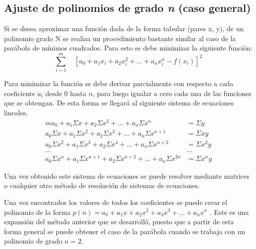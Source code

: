 \documentclass[11pt,letterpaper]{article}
\begin{document}
\subsection{Ajuste de polinomios de grado \textit{n}	 (caso general)}
Si se desea aproximar una función dada de la forma tabular (pares x, y), de un polinomio grado N se realiza un procedimiento bastante similar al caso de la parábola de mínimos cuadrados. Para esto se debe minimizar la siguiente función:
\begin{equation} \label{	equation:ajuste}
	\sum_{i=1}^{m} \quad [ a_0 + a_1x_i + a_2x_i^2 + \dots + a_nx_i^n - f(x_i)] ^ 2
\end{equation}
\par
Para minimizar la función se debe derivar parcialmente con respecto a cada coeficiente $a_i$ desde 0 hasta $n$, para luego igualar a cero cada una de las funciones que se obtengan. De esta forma se llegará al siguiente sistema de ecuaciones lineales.
\begin{align}\label{equation:sist-gradon}
	ma_0 + a_1\Sigma x + a_2\Sigma x^2 + \dots + a_n\Sigma x^n &= \Sigma y \\
	a_0\Sigma x + a_1\Sigma x^2 + a_2\Sigma x^3 + \dots + a_n\Sigma x^{n+1} &= \Sigma xy\\
	a_0\Sigma x ^2 + a_1\Sigma x^3 + a_2\Sigma x^4 + \dots + a_n\Sigma x^{n+2} &= \Sigma x^2y \\
	\dots  & \dots \\
	a_0\Sigma x^n + a_1\Sigma x^{n+1} + a_2\Sigma x^{n+2} + \dots + a_n\Sigma x^{2n} &= \Sigma  x^ny
\end{align}
\par
Una vez obtenido este sistema de ecuaciones se puede resolver mediante matrices o cualquier otro método de resolución de sistemas de ecuaciones.
\par  Una vez encontrados los valores de todos los coeficientes se puede crear el polinomio de la forma  $p(n) = a_0 + a_1x + a_2x^2 + a_3x^3 + \dots + a_nx^n$ . Este es una expansión del método anterior que se desarrolló, puesto que a partir de esta forma general se puede obtener el caso de la parábola cuando se trabaja con un polinomio de grado $n = 2$.\cite{nieves2011metodos} 
\end{document}
